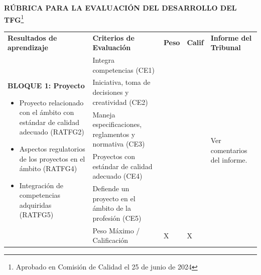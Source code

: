 %
%

\begin{landscape}
\thispagestyle{plain}
\noindent \textbf{RÚBRICA PARA LA EVALUACIÓN DEL DESARROLLO DEL TFG}\footnote{Aprobado en Comisión de Calidad el 25 de junio de 2024}
\renewcommand{\arraystretch}{1.3} %

\begin{table}[ht]
  \centering
  \small
\begin{tabularx}{\linewidth}{|p{7cm}|p{9cm}|p{1cm}|p{1cm}|p{5cm}|}
\cline{1-5}
\textbf{Resultados de aprendizaje} & \textbf{Criterios de Evaluación} & \textbf{Peso} & \textbf{Calif} & \textbf{Informe del Tribunal} \\ \cline{1-5}
  \multirow{7}{=}{%
  \begin{minipage}[t]{7cm}
    \textbf{BLOQUE 1: Proyecto}
    \begin{itemize}[left=5pt, itemsep=1pt, topsep=1pt]
      \item Proyecto relacionado con el ámbito con estándar de calidad adecuado (RATFG2)
      \item Aspectos regulatorios de los proyectos en el ámbito (RATFG4)
      \item Integración de competencias adquiridas (RATFG5)
    \end{itemize}
  \end{minipage}}
    & Integra competencias (CE1) &  &  & \multirow[c]{7}{=}{\centering \footnotesize Ver comentarios del informe.} \\ \cline{2-4}
    & Iniciativa, toma de decisiones y creatividad (CE2) &  &  &  \\ \cline{2-4}
    & Maneja especificaciones, reglamentos y normativa (CE3) &  &  &  \\ \cline{2-4}
    & Proyectos con estándar de calidad adecuado (CE4) &  &  &  \\ \cline{2-4}
    & Defiende un proyecto en el ámbito de la profesión (CE5) &  &  &  \\ \cline{2-4}
    & \cellcolor[HTML]{C0C0C0}Peso Máximo / Calificación & \multirow[c]{2}{=}{\centering X} & \multirow[c]{2}{=}{\centering X} &  \\

\end{tabularx}
\end{table}
\end{landscape}
